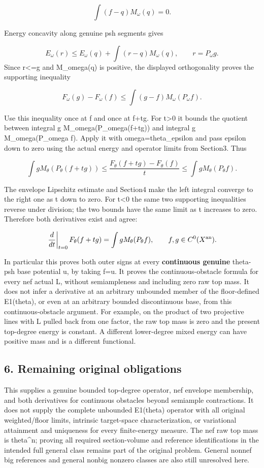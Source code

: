 \documentclass[
]{article}
\begin{document}
\[\int(f-q)M_\omega(q)=0.\]

Energy concavity along genuine psh segments gives

\[E_\omega(r)\leq E_\omega(q)+\int(r-q)M_\omega(q),\qquad r=P_\omega g.\]
Since r\textless=g and M\_omega(q) is positive, the displayed
orthogonality proves the supporting inequality

\[F_\omega(g)-F_\omega(f)\leq\int(g-f)M_\omega(P_\omega f).\]

Use this inequality once at f and once at f+tg. For t\textgreater0 it
bounds the quotient between integral g M\_omega(P\_omega(f+tg)) and
integral g M\_omega(P\_omega f). Apply it with omega=theta\_epsilon and
pass epsilon down to zero using the actual energy and operator limits
from Section3. Thus

\[\int gM_\theta(P_\theta(f+tg))\leq
\frac{F_\theta(f+tg)-F_\theta(f)}t\leq
\int gM_\theta(P_\theta f).\]

The envelope Lipschitz estimate and Section4 make the left integral
converge to the right one as t down to zero. For t\textless0 the same
two supporting inequalities reverse under division; the two bounds have
the same limit as t increases to zero. Therefore both derivatives exist
and agree:

\[\left.\frac{d}{dt}\right|_{t=0}F_\theta(f+tg)=\int gM_\theta(P_\theta f),\qquad f,g\in C^0(X^{\rm an}).\]

In particular this proves both outer signs at every \textbf{continuous
genuine} theta-psh base potential u, by taking f=u. It proves the
continuous-obstacle formula for every nef actual L, without
semiampleness and including zero raw top mass. It does not infer a
derivative at an arbitrary unbounded member of the floor-defined
E1(theta), or even at an arbitrary bounded discontinuous base, from this
continuous-obstacle argument. For example, on the product of two
projective lines with L pulled back from one factor, the raw top mass is
zero and the present top-degree energy is constant. A different
lower-degree mixed energy can have positive mass and is a different
functional.

\subsection{6. Remaining original
obligations}\label{remaining-original-obligations}

This supplies a genuine bounded top-degree operator, nef envelope
membership, and both derivatives for continuous obstacles beyond
semiample contractions. It does not supply the complete unbounded
E1(theta) operator with all original weighted/floor limits, intrinsic
target-space characterization, or variational attainment and uniqueness
for every finite-energy measure. The nef raw top mass is theta\^{}n;
proving all required section-volume and reference identifications in the
intended full general class remains part of the original problem.
General nonnef big references and general nonbig nonzero classes are
also still unresolved here.
\end{document}

